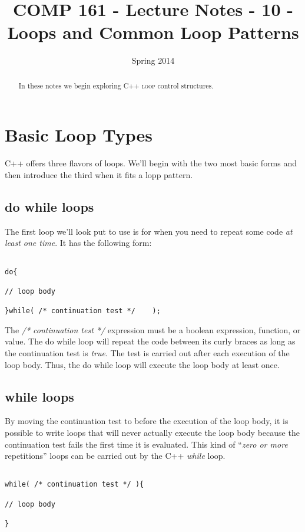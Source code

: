 \documentclass[]{tufte-handout}
\title{COMP 161 - Lecture Notes - 10 - Loops and Common Loop Patterns}
\date{Spring 2014}
\begin{document}
 
\maketitle

\begin{abstract}
In these notes we begin exploring C++ \textsc{loop} control structures.
\end{abstract}


\section{Basic Loop Types}

C++ offers three flavors of loops.  We'll begin with the two most basic forms and then introduce the third when it fits a lopp pattern. 

\subsection{do while loops}

The first loop we'll look put to use is for when you need to repeat some code \textit{at least one time}.  It has the following form:
\begin{verbatim}

do{
 
// loop body

}while( /* continuation test */    );

\end{verbatim}
The \textit{/* continuation test */} expression must be a boolean expression, function, or value.  The do while loop will repeat the code between its curly braces as long as the continuation test is \textit{true}. The test is carried out after each execution of the loop body.  Thus, the do while loop will execute the loop body at least once. 

\subsection{while loops}

By moving the continuation test to before the execution of the loop body, it is possible to write loops that will never actually execute the loop body because the continuation test fails the first time it is evaluated.  This kind of ``\textit{zero or more} repetitions'' loops can be carried out by the C++ \textit{while} loop.
\begin{verbatim}

while( /* continuation test */ ){

// loop body

}

\end{verbatim}
\end{document}
